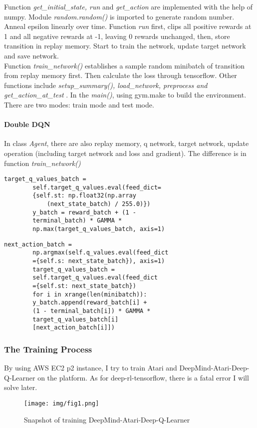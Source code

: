 \documentclass[10pt,twocolumn,letterpaper]{article}
\begin{document}
	Function \emph{get\_initial\_state, run} and \emph{get\_action} are implemented with the help of numpy. Module \emph{random.random()} is imported to generate random number. Anneal epsilon linearly over time. Function \emph{run} first, clips all positive rewards at 1 and all negative rewards at -1, leaving 0 rewards unchanged, then, store transition in replay memory. Start to train the network, update target network and save network.\\
	Function \emph{train\_network()} establishes a sample random minibatch of transition from replay memory first. Then calculate the loss through tensorflow. Other functions include \emph{setup\_summary(), load\_network, preprocess and get\_action\_at\_test }. In the \emph{main()}, using gym.make to build the environment. There are two modes: train mode and test mode.
	\paragraph{Double DQN}
	In class \emph{Agent}, there are also replay memory, q network, target network, update operation (including target network and loss and gradient). The difference is in function \emph{train\_network()}
	\begin{lstlisting}[title=dqn.py, frame=shadowbox]
		target_q_values_batch =
		self.target_q_values.eval(feed_dict=
		{self.st: np.float32(np.array
			(next_state_batch) / 255.0)})
		y_batch = reward_batch + (1 - 
		terminal_batch) * GAMMA * 
		np.max(target_q_values_batch, axis=1)
	\end{lstlisting}
	
	\begin{lstlisting}[title=ddqn.py, frame=shadowbox]
		next_action_batch =
		np.argmax(self.q_values.eval(feed_dict
		={self.s: next_state_batch}), axis=1)
		target_q_values_batch =
		self.target_q_values.eval(feed_dict
		={self.st: next_state_batch})
		for i in xrange(len(minibatch)):
		y_batch.append(reward_batch[i] +
		(1 - terminal_batch[i]) * GAMMA *
		target_q_values_batch[i]
		[next_action_batch[i]])
	\end{lstlisting}
	
	\subsubsection{The Training Process}
	By using AWS EC2 p2 instance, I try to train Atari and DeepMind-Atari-Deep-Q-Learner on the platform. As for deep-rl-tensorflow, there is a fatal error I will solve later.
	\begin{figure}[H]
		\begin{center}
			\texttt{[image: img/fig1.png]}
		\end{center}
		\caption{Snapshot of training  DeepMind-Atari-Deep-Q-Learner}
		\label{fig:long}
		\label{fig:onecol}
	\end{figure}
	
\end{document}

